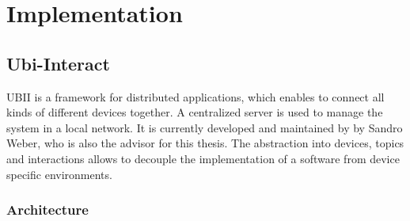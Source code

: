 \chapter{Implementation}\label{chapter:implementation}

\section{Ubi-Interact}\label{section:ubi-interact}

\ac{UBII} is a framework for distributed applications, which enables to connect all kinds of different devices together. A centralized server is used to manage the system in a local network. It is currently developed and maintained by by Sandro Weber, who is also the advisor for this thesis. The abstraction into devices, topics and interactions allows to decouple the implementation of a software from device specific environments.

\subsection{Architecture}\label{subsection:architecture}


